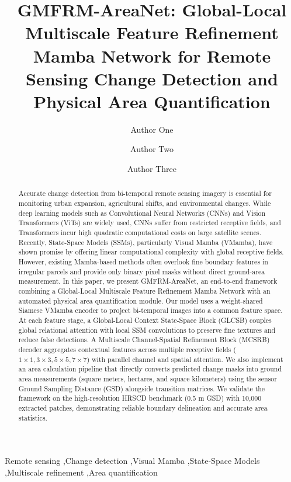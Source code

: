 \documentclass[final,5p,times,twocolumn]{elsarticle}
\begin{document}
\begin{frontmatter}

\title{GMFRM-AreaNet: Global-Local Multiscale Feature Refinement Mamba Network for Remote Sensing Change Detection and Physical Area Quantification}

\author[inst1]{Author One}
\author[inst1]{Author Two}
\author[inst2]{Author Three}


\begin{abstract}
Accurate change detection from bi-temporal remote sensing imagery is essential for monitoring urban expansion, agricultural shifts, and environmental changes. While deep learning models such as Convolutional Neural Networks (CNNs) and Vision Transformers (ViTs) are widely used, CNNs suffer from restricted receptive fields, and Transformers incur high quadratic computational costs on large satellite scenes. Recently, State-Space Models (SSMs), particularly Visual Mamba (VMamba), have shown promise by offering linear computational complexity with global receptive fields. However, existing Mamba-based methods often overlook fine boundary features in irregular parcels and provide only binary pixel masks without direct ground-area measurement. In this paper, we present GMFRM-AreaNet, an end-to-end framework combining a Global-Local Multiscale Feature Refinement Mamba Network with an automated physical area quantification module. Our model uses a weight-shared Siamese VMamba encoder to project bi-temporal images into a common feature space. At each feature stage, a Global-Local Context State-Space Block (GLCSB) couples global relational attention with local SSM convolutions to preserve fine textures and reduce false detections. A Multiscale Channel-Spatial Refinement Block (MCSRB) decoder aggregates contextual features across multiple receptive fields ($1\times1, 3\times3, 5\times5, 7\times7$) with parallel channel and spatial attention. We also implement an area calculation pipeline that directly converts predicted change masks into ground area measurements (square meters, hectares, and square kilometers) using the sensor Ground Sampling Distance (GSD) alongside transition matrices. We validate the framework on the high-resolution HRSCD benchmark ($0.5\text{ m}$ GSD) with 10,000 extracted patches, demonstrating reliable boundary delineation and accurate area statistics.
\end{abstract}

\begin{keyword}
Remote sensing \sep Change detection \sep Visual Mamba \sep State-Space Models \sep Multiscale refinement \sep Area quantification
\end{keyword}

\end{frontmatter}
\end{document}
